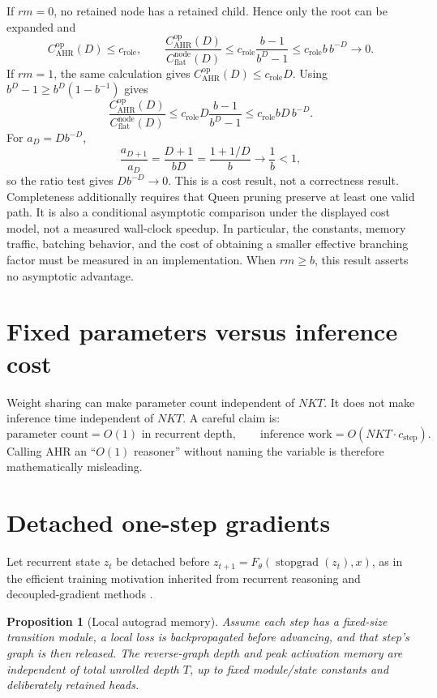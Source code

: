 \documentclass[11pt,oneside]{book}
\newtheorem{proposition}[definition]{Proposition}
\theoremstyle{remark}
\begin{document}
If $rm=0$, no retained node has a retained child. Hence only the root can be
expanded and
\[
C_{\mathrm{AHR}}^{\mathrm{op}}(D)\le c_{\mathrm{role}},
\qquad
\frac{C_{\mathrm{AHR}}^{\mathrm{op}}(D)}
{C_{\mathrm{flat}}^{\mathrm{node}}(D)}
\le c_{\mathrm{role}}\frac{b-1}{b^D-1}
\le c_{\mathrm{role}}b\,b^{-D}\to0.
\]
If $rm=1$, the same calculation gives
$C_{\mathrm{AHR}}^{\mathrm{op}}(D)\le c_{\mathrm{role}}D$. Using
$b^D-1\ge b^D(1-b^{-1})$ gives
\[
\frac{C_{\mathrm{AHR}}^{\mathrm{op}}(D)}
{C_{\mathrm{flat}}^{\mathrm{node}}(D)}
\le c_{\mathrm{role}}D\frac{b-1}{b^D-1}
\le c_{\mathrm{role}}bD\,b^{-D}.
\]
For $a_D=Db^{-D}$,
\[
\frac{a_{D+1}}{a_D}=\frac{D+1}{bD}
=\frac{1+1/D}{b}\longrightarrow\frac1b<1,
\]
so the ratio test gives $Db^{-D}\to0$. This is a cost result, not a
correctness result.
Completeness additionally requires that Queen pruning preserve at least one
valid path. It is also a conditional asymptotic comparison under the displayed
cost model, not a measured wall-clock speedup. In particular, the constants,
memory traffic, batching behavior, and the cost of obtaining a smaller
effective branching factor must be measured in an implementation.
When $rm\ge b$, this result asserts no asymptotic advantage.

\section{Fixed parameters versus inference cost}

Weight sharing can make parameter count independent of $NKT$. It does not make inference time independent of $NKT$. A careful claim is:
\[
\text{parameter count}=O(1)\text{ in recurrent depth},
\qquad
\text{inference work}=O(NKT\cdot c_{\mathrm{step}}).
\]
Calling AHR an ``$O(1)$ reasoner'' without naming the variable is therefore mathematically misleading.

\section{Detached one-step gradients}

Let recurrent state $z_t$ be detached before
$z_{t+1}=F_\theta(\operatorname{stopgrad}(z_t),x)$, as in the efficient
training motivation inherited from recurrent reasoning and decoupled-gradient
methods \cite{WangHRM2025,JaderbergSynthetic2017}.

\begin{proposition}[Local autograd memory]
Assume each step has a fixed-size transition module, a local loss is
backpropagated before advancing, and that step's graph is then released. The
reverse-graph depth and peak activation memory are independent of total
unrolled depth $T$, up to fixed module/state constants and deliberately
retained heads.
\end{proposition}
\end{document}
